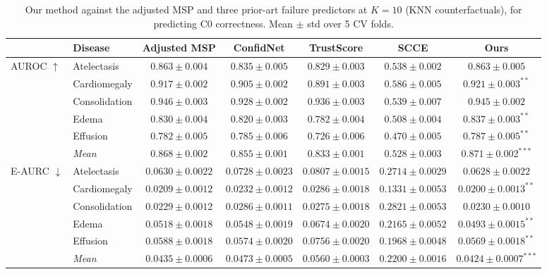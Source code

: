 \begin{table}[htbp]
\centering
\small
\caption{Our method against the adjusted MSP and three prior-art failure predictors at $K=10$ (KNN counterfactuals), for predicting C0 correctness. Mean $\pm$ std over 5 CV folds.}
\label{tab:baselines_knn}
\begin{threeparttable}
\begin{tabular}{ll|c|ccc|c}
\toprule
 & Disease & Adjusted MSP & ConfidNet & TrustScore & SCCE & Ours \\
\midrule
\multirow{6}{*}{AUROC $\uparrow$} & Atelectasis & $\mathbf{0.863} \pm 0.004$ & $0.835 \pm 0.005$ & $0.829 \pm 0.003$ & $0.538 \pm 0.002$ & $0.863 \pm 0.005$ \\
 & Cardiomegaly & $0.917 \pm 0.002$ & $0.905 \pm 0.002$ & $0.891 \pm 0.003$ & $0.586 \pm 0.005$ & $\mathbf{0.921} \pm 0.003^{**}$ \\
 & Consolidation & $\mathbf{0.946} \pm 0.003$ & $0.928 \pm 0.002$ & $0.936 \pm 0.003$ & $0.539 \pm 0.007$ & $0.945 \pm 0.002$ \\
 & Edema & $0.830 \pm 0.004$ & $0.820 \pm 0.003$ & $0.782 \pm 0.004$ & $0.508 \pm 0.004$ & $\mathbf{0.837} \pm 0.003^{**}$ \\
 & Effusion & $0.782 \pm 0.005$ & $0.785 \pm 0.006$ & $0.726 \pm 0.006$ & $0.470 \pm 0.005$ & $\mathbf{0.787} \pm 0.005^{**}$ \\
\cmidrule(l){2-7}
 & \textit{Mean} & $0.868 \pm 0.002$ & $0.855 \pm 0.001$ & $0.833 \pm 0.001$ & $0.528 \pm 0.003$ & $\mathbf{0.871} \pm 0.002^{***}$ \\
\midrule
\multirow{6}{*}{E-AURC $\downarrow$} & Atelectasis & $0.0630 \pm 0.0022$ & $0.0728 \pm 0.0023$ & $0.0807 \pm 0.0015$ & $0.2714 \pm 0.0029$ & $\mathbf{0.0628} \pm 0.0022$ \\
 & Cardiomegaly & $0.0209 \pm 0.0012$ & $0.0232 \pm 0.0012$ & $0.0286 \pm 0.0018$ & $0.1331 \pm 0.0053$ & $\mathbf{0.0200} \pm 0.0013^{**}$ \\
 & Consolidation & $\mathbf{0.0229} \pm 0.0012$ & $0.0286 \pm 0.0011$ & $0.0275 \pm 0.0018$ & $0.2821 \pm 0.0053$ & $0.0230 \pm 0.0010$ \\
 & Edema & $0.0518 \pm 0.0018$ & $0.0548 \pm 0.0019$ & $0.0674 \pm 0.0020$ & $0.2165 \pm 0.0052$ & $\mathbf{0.0493} \pm 0.0015^{**}$ \\
 & Effusion & $0.0588 \pm 0.0018$ & $0.0574 \pm 0.0020$ & $0.0756 \pm 0.0020$ & $0.1968 \pm 0.0048$ & $\mathbf{0.0569} \pm 0.0018^{**}$ \\
\cmidrule(l){2-7}
 & \textit{Mean} & $0.0435 \pm 0.0006$ & $0.0473 \pm 0.0005$ & $0.0560 \pm 0.0003$ & $0.2200 \pm 0.0016$ & $\mathbf{0.0424} \pm 0.0007^{***}$ \\

\end{tabular}
\end{threeparttable}
\end{table}
